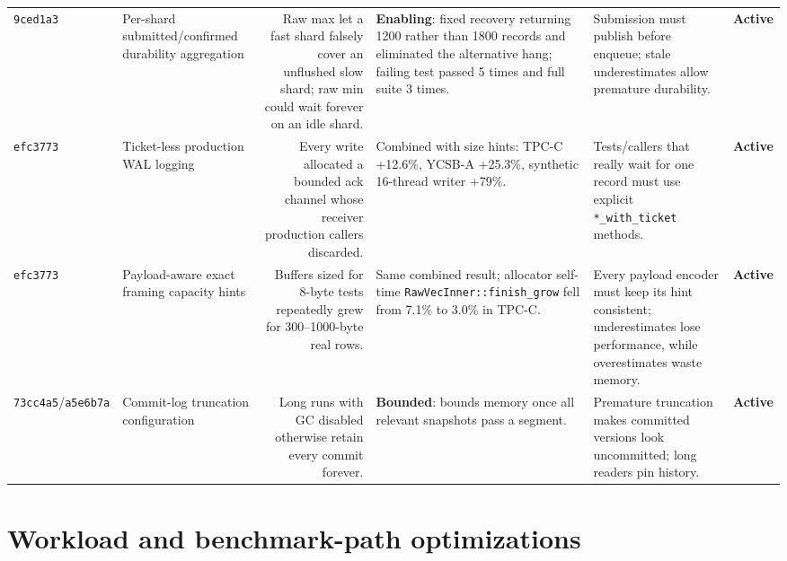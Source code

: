 \documentclass[10pt,a4paper,landscape]{article}
\newcommand{\code}[1]{\texttt{#1}}
\newcommand{\commit}[1]{\code{#1}}
\newcommand{\gainbounded}{\textbf{Bounded}}
\newcommand{\gainenabling}{\textbf{Enabling}}
\newcommand{\stateactive}{\textbf{Active}}
\begin{document}
\begin{longtable}{IORGKS}
\commit{9ced1a3} & Per-shard submitted/confirmed durability aggregation & Raw max let a
fast shard falsely cover an unflushed slow shard; raw min could wait forever on an idle
shard. & \gainenabling: fixed recovery returning 1200 rather than 1800 records and eliminated
the alternative hang; failing test passed 5 times and full suite 3 times. & Submission
must publish before enqueue; stale underestimates allow premature durability. & \stateactive \\

\commit{efc3773} & Ticket-less production WAL logging & Every write allocated a bounded
ack channel whose receiver production callers discarded. & Combined with size hints:
TPC-C +12.6\%, YCSB-A +25.3\%, synthetic 16-thread writer +79\%. & Tests/callers that
really wait for one record must use explicit \code{*\_with\_ticket} methods. & \stateactive \\

\commit{efc3773} & Payload-aware exact framing capacity hints & Buffers sized for 8-byte
tests repeatedly grew for 300--1000-byte real rows. & Same combined result; allocator
self-time \code{RawVecInner::finish\_grow} fell from 7.1\% to 3.0\% in TPC-C. & Every
payload encoder must keep its hint consistent; underestimates lose performance, while
overestimates waste memory. & \stateactive \\

\commit{73cc4a5}/\commit{a5e6b7a} & Commit-log truncation configuration & Long runs with
GC disabled otherwise retain every commit forever. & \gainbounded: bounds memory once all
relevant snapshots pass a segment. & Premature truncation makes committed versions look
uncommitted; long readers pin history. & \stateactive \\
\bottomrule
\end{longtable}

\section{Workload and benchmark-path optimizations}
\end{document}
